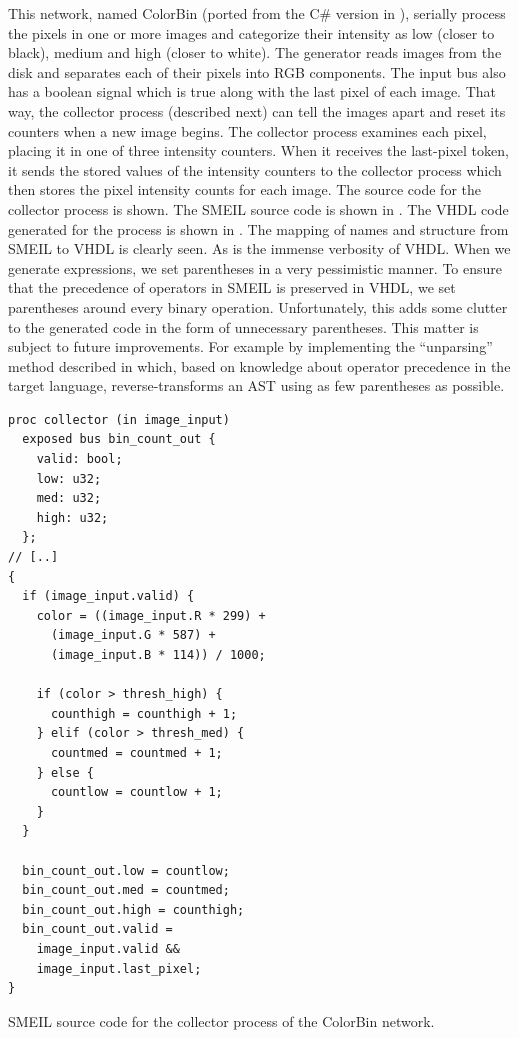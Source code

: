 This network, named ColorBin (ported from the C\# version in
\cite{skovhede2017c++}), serially process the pixels in one or more images and
categorize their intensity as low (closer to black), medium and high (closer to
white). The generator reads images from the disk and separates each of their
pixels into RGB components. The input bus also has a boolean signal which is
true along with the last pixel of each image. That way, the collector process
(described next) can tell the images apart and reset its counters when a new
image begins. The collector process examines each pixel, placing it in one of
three intensity counters. When it receives the last-pixel token, it sends the
stored values of the intensity counters to the collector process which then
stores the pixel intensity counts for each image. The source code for the
collector process is shown. The SMEIL source code is shown in
. The VHDL code generated for the process is shown in
. The mapping of names and structure from SMEIL to VHDL is
clearly seen. As is the immense verbosity of VHDL. When we generate expressions,
we set parentheses in a very pessimistic manner. To ensure that the precedence
of operators in SMEIL is preserved in VHDL, we set parentheses around every
binary operation. Unfortunately, this adds some clutter to the generated code in
the form of unnecessary parentheses. This matter is subject to future
improvements. For example by implementing the ``unparsing'' method described in
\cite{ramsey1998unparsing} which, based on knowledge about operator precedence
in the target language, reverse-transforms an AST using as few parentheses as
possible.

\begin{widefigure}

\begin{lstlisting}[language=smeil,multicols=2]
proc collector (in image_input)
  exposed bus bin_count_out {
    valid: bool;
    low: u32;
    med: u32;
    high: u32;
  };
// [..]
{
  if (image_input.valid) {
    color = ((image_input.R * 299) +
      (image_input.G * 587) +
      (image_input.B * 114)) / 1000;

    if (color > thresh_high) {
      counthigh = counthigh + 1;
    } elif (color > thresh_med) {
      countmed = countmed + 1;
    } else {
      countlow = countlow + 1;
    }
  }

  bin_count_out.low = countlow;
  bin_count_out.med = countmed;
  bin_count_out.high = counthigh;
  bin_count_out.valid =
    image_input.valid &&
    image_input.last_pixel;
}
\end{lstlisting}
  \caption{SMEIL source code for the collector process of the ColorBin network.}
  \label{fig:collector}
\end{widefigure}

